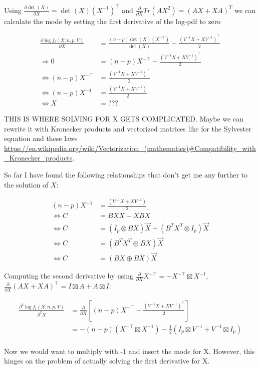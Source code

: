 \documentclass{article}
\begin{document}
Using $\frac{\partial \det(X)}{\partial X} = \det(X)(X^{-1})^\top$ and $\frac{\partial}{\partial X} Tr(AX^2) = (AX + XA)^T$ we can calculate the mode by setting the first derivative of the log-pdf to zero

\begin{align*}
\frac{\partial \log f_t(X; n,p,V)}{\partial X} &= \frac{(n-p)\det(X)(X^{-\top})}{\det(X)} - \frac{(V^{-1}X + XV^{-1})^\top}{2} \\
\Rightarrow 0 &= (n-p)X^{-\top} - \frac{(V^{-1}X + XV^{-1})^\top}{2} \\
\Leftrightarrow  (n-p)X^{-\top} &=  \frac{(V^{-1}X + XV^{-1})^\top}{2} \\
\Leftrightarrow  (n-p)X^{-1} &=  \frac{(V^{-1}X + XV^{-1})}{2} \\
\Leftrightarrow X &= ???
\end{align*}

THIS IS WHERE SOLVING FOR X GETS COMPLICATED. Maybe we can rewrite it with Kronecker products and vectorized matrices like for the Sylvester equation and these laws \url{https://en.wikipedia.org/wiki/Vectorization_(mathematics)#Compatibility_with_Kronecker_products}.

So far I have found the following relationships that don't get me any further to the solution of $X$:

\begin{align*}
 (n-p)X^{-1} &=  \frac{(V^{-1}X + XV^{-1})}{2} \\
\Leftrightarrow C &= BXX + XBX \\
\Leftrightarrow C &= (I_p \otimes BX)\vec{X} + (B^TX^T \otimes I_p)\vec{X} \\
\Leftrightarrow C &= (B^TX^T \oplus BX)\vec{X} \\
\Leftrightarrow C &= (BX \oplus BX)\vec{X}
\end{align*}

Computing the second derivative by using $\frac{\partial}{\partial X}X^{-\top} = -X^{-\top} \boxtimes X^{-1}$, $\frac{\partial}{\partial X} (AX + XA)^\top = I \boxtimes A + A \boxtimes I$:

\begin{align*}
\frac{\partial^2 \log f_t(X; n,p,V)}{\partial^2 X} &= \frac{\partial}{\partial X} \left[(n-p)X^{-\top} - \frac{(V^{-1}X + XV^{-1})^\top}{2}\right] \\
&= -(n-p) (X^{-\top} \boxtimes X^{-1}) -\frac{1}{2}(I_p \boxtimes V^{-1} + V^{-1} \boxtimes I_p) \\
\end{align*}

Now we would want to multiply with -1 and insert the mode for X. However, this hinges on the problem of actually solving the first derivative for X. 
\end{document}

